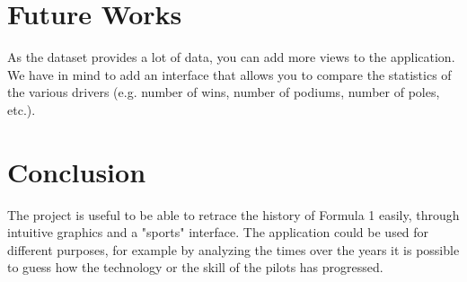 \documentclass[10pt,twocolumn,letterpaper]{article}
\begin{document}
\section{Future Works}
As the dataset provides a lot of data, you can add more views to the application. We have in mind to add an interface that allows you to compare the statistics of the various 
drivers (e.g. number of wins, number of podiums, number of poles, etc.). 

\section{Conclusion}
The project is useful to be able to retrace the history of Formula 1 easily, through intuitive graphics and a "sports" interface. The application could be used for different purposes,
for example by analyzing the times over the years it is possible to guess how the technology or the skill of the pilots has progressed.

\clearpage

\end{document}
